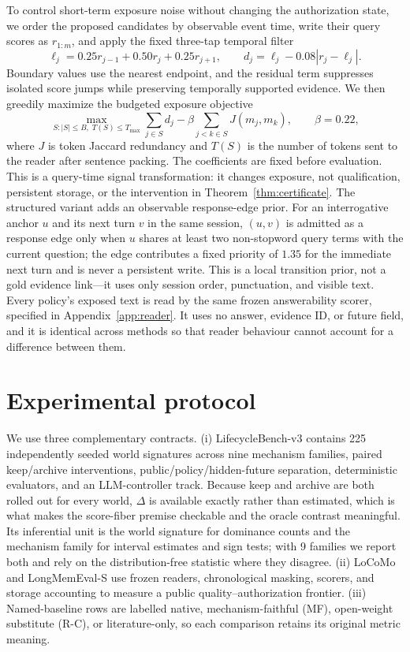 \documentclass{article}
\begin{document}
To control short-term exposure noise without changing the authorization state, we order the proposed candidates by observable event time, write their query scores as $r_{1:m}$, and apply the fixed three-tap temporal filter
\begin{equation}
\ell_j=0.25r_{j-1}+0.50r_j+0.25r_{j+1},\qquad
d_j=\ell_j-0.08|r_j-\ell_j|.
\label{eq:fir-denoise}
\end{equation}
Boundary values use the nearest endpoint, and the residual term suppresses
isolated score jumps while preserving temporally supported evidence. We then
greedily maximize the budgeted exposure objective
\begin{equation}
\max_{S:|S|\le B,\;T(S)\le T_{\max}}
\sum_{j\in S}d_j-\beta\sum_{j<k\in S}J(m_j,m_k),\qquad \beta=0.22,
\label{eq:denoise-pack}
\end{equation}
where $J$ is token Jaccard redundancy and $T(S)$ is the number of tokens sent to the reader after sentence packing. The coefficients are fixed before evaluation. This is a query-time signal transformation: it changes exposure, not qualification, persistent storage, or the intervention in Theorem~\ref{thm:certificate}.
The structured variant adds an observable response-edge prior. For an interrogative
anchor $u$ and its next turn $v$ in the same session, $(u,v)$ is admitted as a
response edge only when $u$ shares at least two non-stopword query terms with the
current question; the edge contributes a fixed priority of $1.35$ for the immediate
next turn and is never a persistent write. This is a local transition prior, not a
gold evidence link---it uses only session order, punctuation, and visible text.
Every policy's exposed text is read by the same frozen answerability scorer,
specified in Appendix~\ref{app:reader}. It uses no answer, evidence ID, or future
field, and it is identical across methods so that reader behaviour cannot account
for a difference between them.

\section{Experimental protocol}
We use three complementary contracts. (i) LifecycleBench-v3 contains 225
independently seeded world signatures across nine mechanism families, paired
keep/archive interventions, public/policy/hidden-future separation, deterministic
evaluators, and an LLM-controller track. Because keep and archive are both rolled
out for every world, $\Delta$ is available exactly rather than estimated, which is
what makes the score-fiber premise checkable and the oracle contrast meaningful.
Its inferential unit is the world signature for dominance counts and the mechanism
family for interval estimates and sign tests; with 9 families we report both and
rely on the distribution-free statistic where they disagree. (ii) LoCoMo \citep{maharana2024locomo} and LongMemEval-S \citep{wu2024longmemeval} use frozen readers, chronological masking, scorers, and storage accounting to measure a public quality--authorization frontier. (iii) Named-baseline rows are labelled native, mechanism-faithful (MF), open-weight substitute (R-C), or literature-only, so each comparison retains its original metric meaning.
\end{document}

